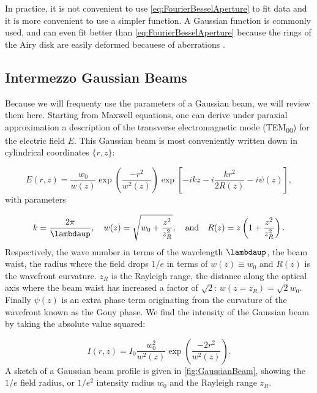 In practice, it is not convenient to use \cref{eq:FourierBesselAperture} to fit data and it is more convenient to use a simpler function. 
A Gaussian function is commonly used, and can even fit better than \cref{eq:FourierBesselAperture} because the rings of the Airy disk are easily deformed becauese of aberrations \cite{Knottnerus2018}. 

\mbox{}\par
\begin{mdframed}
    \subsection*{Intermezzo Gaussian Beams}\label{sec:GaussianBeams}
    
    Because we will frequenty use the parameters of a Gaussian beam, we will review them here. 
    Starting from Maxwell equations, one can derive under paraxial approximation a description of the transverse electromagnetic mode (TEM\textsubscript{00}) \cite{Leeuwen2017} for the electric field $E$.
    This Gaussian beam is most conveniently written down in cylindrical coordinates $\{r,z\}$:
    
    \begin{equation}\label{eq:GaussianBeam}
    	E(r,z) = \frac{w_0}{w(z)} \exp{\left(\frac{-r^2}{w^2(z)}\right)} \exp{\left[-ikz-i\frac{kr^2}{2R(z)} - i\psi(z)\right]},
    \end{equation}
    with parameters
    
    \begin{equation}\label{eq:GaussianBeamParameters}
    	k = \frac{2\pi}{\lambdaup}, \quad 
    	w(z) = \sqrt{w_0 + \frac{z^2}{z_R^2}}, \quad \text{and} \quad
    	R(z) = z \left(1 + \frac{z^2}{z_R^2}\right).
    \end{equation}
    Respectively, the wave number in terms of the wavelength $\lambdaup$, the beam waist, the radius where the field drops $1/e$ in terms of $w(z)\equiv w_0$ and $R(z)$ is the wavefront curvature. $z_R$ is the Rayleigh range, the distance along the optical axis where the beam waist has increased a factor of $\sqrt{2}$: $w(z=z_R) = \sqrt{2}w_0$.
    Finally $\psi(z)$ is an extra phase term originating from the curvature of the wavefront known as the Gouy phase.
    We find the intensity of the Gaussian beam by taking the absolute value squared:
    
    \begin{equation}\label{eq:GaussianBeamIntensity}
    	I(r,z) = I_0 \frac{w_0^2}{w^2(z)} \exp{\left(\frac{-2r^2}{w^2(z)}\right)}.
    \end{equation}
    A sketch of a Gaussian beam profile is given in \cref{fig:GaussianBeam}, showing the $1/e$ field radius, or $1/e^2$ intensity radius $w_0$ and the Rayleigh range $z_R$. 
    

\end{mdframed}
